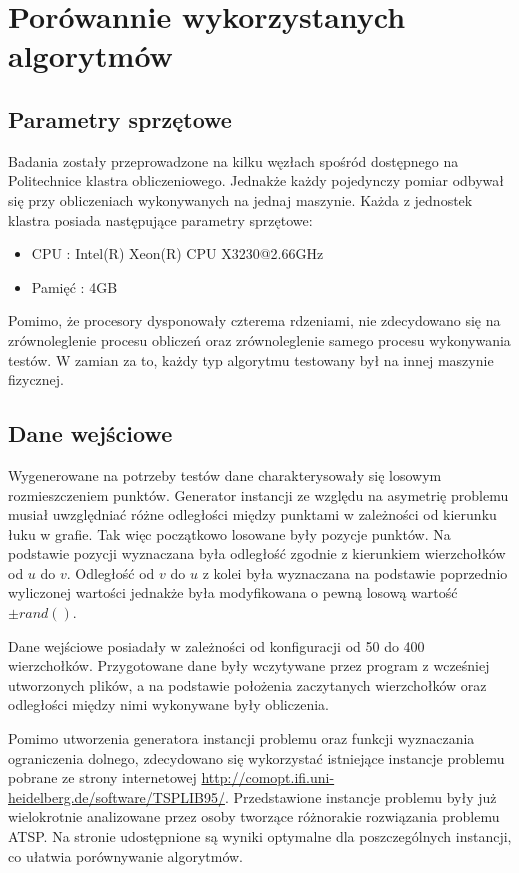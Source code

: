 \section{Porówannie wykorzystanych algorytmów}

\subsection{Parametry sprzętowe}

Badania zostały przeprowadzone na kilku węzłach spośród dostępnego na
Politechnice klastra obliczeniowego. Jednakże każdy pojedynczy pomiar
odbywał się przy obliczeniach wykonywanych na jednaj maszynie.
Każda z jednostek klastra posiada następujące parametry sprzętowe:
\begin{itemize}
 \item CPU : Intel(R) Xeon(R) CPU X3230@2.66GHz
 \item Pamięć : 4GB
\end{itemize}
Pomimo, że procesory dysponowały czterema rdzeniami, nie zdecydowano się
na zrównoleglenie procesu obliczeń oraz zrównoleglenie samego procesu
wykonywania testów. W zamian za to, każdy typ algorytmu testowany był
na innej maszynie fizycznej.

\subsection{Dane wejściowe}

Wygenerowane na potrzeby testów dane charakterysowały się
losowym rozmieszczeniem punktów. Generator instancji ze względu na
asymetrię problemu musiał uwzględniać różne odległości między punktami
w zależności od kierunku łuku w grafie. Tak więc początkowo losowane były
pozycje punktów. Na podstawie pozycji wyznaczana była odległość
zgodnie z kierunkiem wierzchołków od $u$ do $v$. Odległość od $v$ do $u$
z kolei była wyznaczana na podstawie poprzednio wyliczonej wartości
jednakże była modyfikowana o pewną losową wartość $\pm rand()$.


Dane wejściowe posiadały w zależności od konfiguracji od 50 do 400
wierzchołków. Przygotowane dane były wczytywane przez program z wcześniej
utworzonych plików, a na podstawie położenia zaczytanych wierzchołków
oraz odległości między nimi wykonywane były  obliczenia.

Pomimo utworzenia generatora instancji problemu oraz funkcji wyznaczania
ograniczenia dolnego, zdecydowano się wykorzystać istniejące
instancje problemu pobrane ze strony internetowej
\url{http://comopt.ifi.uni-heidelberg.de/software/TSPLIB95/}. Przedstawione
instancje problemu były już wielokrotnie analizowane przez osoby
tworzące różnorakie rozwiązania problemu ATSP. Na stronie udostępnione
są wyniki optymalne dla poszczególnych instancji, co ułatwia porównywanie
algorytmów.

